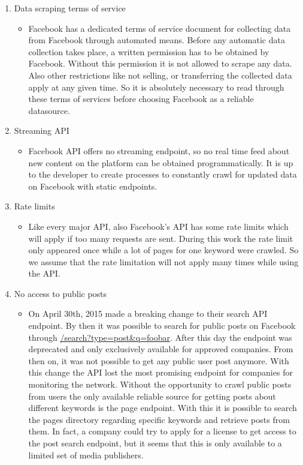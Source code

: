 \documentclass[11pt,titlepage,oneside,openany]{book}
\begin{document}
\begin{enumerate}
   \item Data scraping terms of service
   \begin{itemize}
     \item Facebook has a dedicated terms of service document for collecting data from Facebook 		       through automated means. Before any automatic data collection takes place, a written permission has to be obtained by Facebook. Without this permission it is not allowed to scrape any data. Also other restrictions like not selling, or transferring the collected data apply at any given time. So it is absolutely necessary to read through these terms of services before choosing Facebook as a reliable datasource.~\cite{Facebook2010-04-10}
   \end{itemize}
   \item Streaming API
   \begin{itemize}
     \item Facebook API offers no streaming endpoint, so no real time feed about new content on the platform can be obtained programmatically. It is up to the developer to create processes to constantly crawl for updated data on Facebook with static endpoints.
   \end{itemize}
   \item Rate limits
   \begin{itemize}
     \item Like every major API, also Facebook’s API has some rate limits which will apply if too many requests are sent. During this work the rate limit only appeared once while a lot of pages for one keyword were crawled. So we assume that the rate limitation will not apply many times while using the API.~\cite{Facebook2016-06-09} 
   \end{itemize}
   \item No access to public posts
   \begin{itemize}
     \item On April 30th, 2015 made a breaking change to their search API endpoint. By then it was possible to search for public posts on Facebook through \url{/search?type=post&q=foobar}. After this day the endpoint was deprecated and only exclusively available for approved companies. From then on, it was not possible to get any public user post anymore. With this change the API lost the most promising endpoint for companies for monitoring the network. Without the opportunity to crawl public posts from users the only available reliable source for getting posts about different keywords is the page endpoint. With this it is possible to search the pages directory regarding specific keywords and retrieve posts from them. 
In fact, a company could try to apply for a license to get access to the post search endpoint, but it seems that this is only available to a limited set of media publishers.~\cite{Facebook2013-09-06} 
   \end{itemize}
\end{enumerate}
\end{document}
